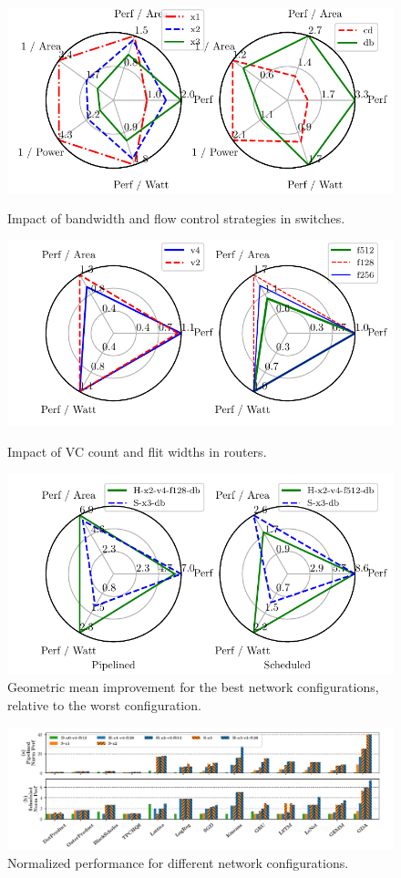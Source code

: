 \begin{figure}
  \centering
\includegraphics[width=0.8\columnwidth]{figs/radar_switch.pdf}
  \caption{
    Impact of bandwidth and flow control strategies in switches.}\label{fig:radar_switch}
\includegraphics[width=0.8\columnwidth]{figs/radar_router.pdf}
  \caption{Impact of VC count and flit widths in routers.}\label{fig:radar_router}
\includegraphics[width=0.8\columnwidth]{figs/radar_best.pdf}
  \caption{Geometric mean improvement for the best network configurations, relative to the worst configuration.}\label{fig:radar_best}
\end{figure}

\begin{figure}
\centering
\includegraphics[width=1\linewidth]{figs/perf.pdf}
  \caption{Normalized performance for different network configurations.}\label{fig:perf}
\end{figure}

